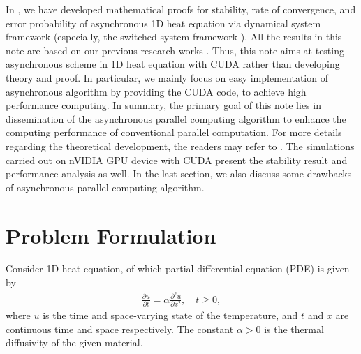 \documentclass[1p]{elsarticle}
\begin{document}
In \citep{lee2015async}, we have developed mathematical proofs for stability, rate of convergence, and error probability of asynchronous 1D heat equation via dynamical system framework (especially, the switched system framework \citep{lee2015stability, lee2015performance}). All the results in this note are based on our previous research works \citep{lee2015async}.
Thus, this note aims at testing asynchronous scheme in 1D heat equation with \textsf{CUDA} rather than developing theory and proof. In particular, we mainly focus on easy implementation of asynchronous algorithm by providing the \textsf{CUDA} code, to achieve high performance computing. In summary, the primary goal of this note lies in dissemination of the asynchronous parallel computing algorithm to enhance the computing performance of conventional parallel computation. For more details regarding the theoretical development, the readers may refer to \citep{lee2015async}. The simulations carried out on \textsf{nVIDIA GPU} device with \textsf{CUDA} present the stability result and performance analysis as well. In the last section, we also discuss some drawbacks of asynchronous parallel computing algorithm.

\section{Problem Formulation}


Consider 1D heat equation, of which partial differential equation (PDE) is given by
\begin{align}
\frac{\partial u}{\partial t} = \alpha\frac{\partial^2 u}{\partial x^2}, \quad t\geq 0, \label{eqn:1}
\end{align}
where $u$ is the time and space-varying state of the temperature, and $t$ and $x$ are continuous time and space respectively. The constant $\alpha>0$ is the thermal diffusivity of the given material. 
\end{document}
